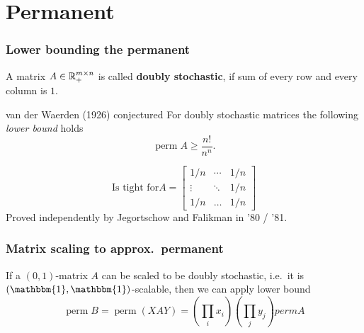 \documentclass{beamer}
\DeclareMathOperator*{\perm}{perm}
\begin{document}
\section{Permanent}%
\label{sec:}

\begin{frame}
  \frametitle{Lower bounding the permanent}
  \begin{definition}
    A matrix $A \in \mathbb{R}^{m\times n}_+$ is called \textbf{doubly stochastic}, if sum of every row and every column is $1$.
  \end{definition}

  \begin{block}{van der Waerden (1926) conjectured}
    For doubly stochastic matrices the following \emph{lower bound} holds
    \begin{equation}
      \perm A \ge \frac{n!}{n^n}.
    \end{equation}
  \end{block}
  \begin{equation}
   \text{Is tight for} A = \begin{bmatrix}
      1/n & \cdots & 1/n \\
      \vdots & \ddots & 1/n \\
      1/n & \dots & 1/n
    \end{bmatrix}
  \end{equation}
  Proved independently by Jegortschow and Falikman in '80 / '81.
\end{frame}


\begin{frame}
  \frametitle{Matrix scaling to approx.\ permanent}
  \begin{block}{}
    If a $(0, 1)$-matrix $A$ can be scaled to be doubly stochastic, i.e.\ it is $\left(\mathbbm{1}, \mathbbm{1}\right)$-scalable, then
    we can apply lower bound
    \begin{equation}
      \perm B = \perm (XAY) = \left(\prod_i x_i\right) \left(\prod_j y_j\right) perm A
    \end{equation}
  \end{block}
\end{frame}
\end{document}
